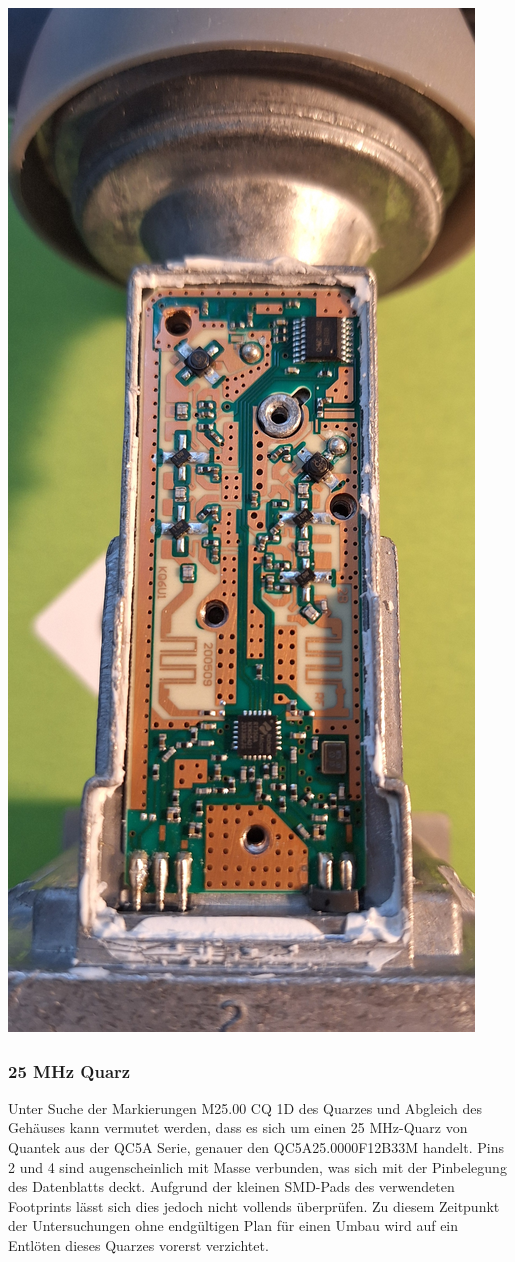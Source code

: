\documentclass[]{article}
\begin{document}
	
	\vspace{2ex}
	\begin{center}
		\begin{minipage}{0.9\textwidth}
			\centering
			\includegraphics[height=\textwidth, angle=90]{./img/20250531_150332.jpg}
		\end{minipage}
	\end{center}
	\vspace{2ex}
	
	
	\subsubsection{25 MHz Quarz}
	
		\noindent Unter Suche der Markierungen \glqq M25.00 CQ 1D\grqq{} des Quarzes und Abgleich des Gehäuses kann vermutet werden, dass es sich um einen 25 MHz-Quarz von Quantek aus der QC5A Serie, genauer den QC5A25.0000F12B33M handelt. Pins 2 und 4 sind augenscheinlich mit Masse verbunden, was sich mit der Pinbelegung des Datenblatts deckt. Aufgrund der kleinen SMD-Pads des verwendeten Footprints lässt sich dies jedoch nicht vollends überprüfen. Zu diesem Zeitpunkt der Untersuchungen ohne endgültigen Plan für einen Umbau wird auf ein Entlöten dieses Quarzes vorerst verzichtet.
		
\end{document}
